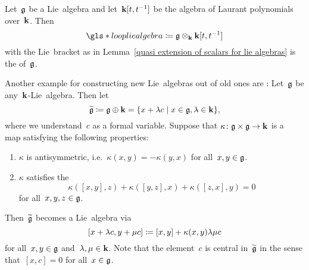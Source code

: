 \begin{definition}
  Let~$\mathfrak{g}$ be a Lie~algebra and let~$\mathbf{k}[t, t^{-1}]$ be the algebra of Laurant polynomials over~$\kf$.
  Then
  \[
    \gls*{loop lie algebra}
    \defined
    \glie \tensor_\kf \kf[t, t^{-1}]
  \]
  with the Lie~bracket as in Lemma~\ref{quasi extension of scalars for lie algebras} is the  of~$\mathfrak{g}$.
\end{definition}
 
 
\begin{example}
  Another example for constructing new Lie~algebras out of old ones are :
  Let~$\mathfrak{g}$ be any~$\kf$-Lie~algebra.
  Then let
  \[
    \widetilde{\glie}
    \defined
    \glie \oplus \kf
    =
    \{
      x + \lambda c
    \suchthat
      x \in \glie,
      \lambda \in \kf
    \},
  \]
  where we understand~$c$ as a formal variable.
  Suppose that $\kappa \colon \mathfrak{g} \times \mathfrak{g} \to \mathbf{k}$ is a~{\bilinear{$\kf$}} map satisfying the following properties:
  \begin{enumerate}
  \item
    $\kappa$ is antisymmetric, i.e.~$\kappa(x,y) = -\kappa(y,x)$ for all~$x,y \in \mathfrak{g}$.
  \item
    $\kappa$ satisfies the 
    \[
      \kappa([x,y],z) + \kappa([y,z],x) + \kappa([z,x],y) = 0
    \]
    for all~$x, y, z \in \mathfrak{g}$.
  \end{enumerate}
  Then~$\widetilde{\mathfrak{g}}$ becomes a Lie~algebra via
  \[
    [x + \lambda c, y + \mu c]
    \coloneqq
    [x,y] + \kappa(x,y) \lambda \mu c
  \]
  for all~$x, y \in \mathfrak{g}$ and~$\lambda, \mu \in \mathbf{k}$.
  Note that the element~$c$ is central in~$\widetilde{\mathfrak{g}}$ in the sense that~$[x,c] = 0$ for all~$x \in \mathfrak{g}$.
  

\end{example}
